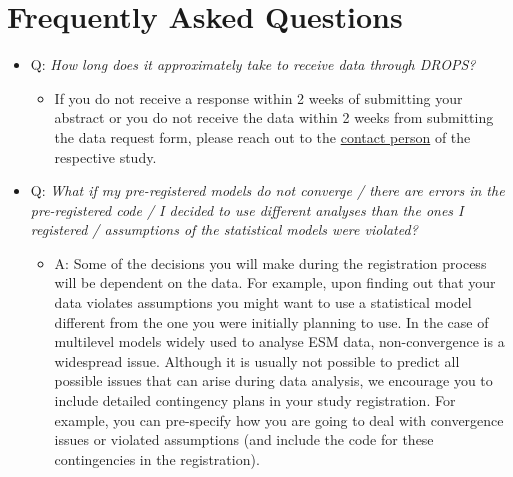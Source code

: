 \documentclass[
]{article}
\providecommand{\tightlist}{%
  \setlength{\itemsep}{0pt}\setlength{\parskip}{0pt}}
\begin{document}
\hypertarget{section-6}{%
\section{}\label{section-6}}

\hypertarget{frequently-asked-questions}{%
\section{Frequently Asked Questions}\label{frequently-asked-questions}}

\begin{itemize}
\tightlist
\item
  Q: \emph{How long does it approximately take to receive data through
  DROPS?}

  \begin{itemize}
  \tightlist
  \item
    If you do not receive a response within 2 weeks of submitting your
    abstract or you do not receive the data within 2 weeks from
    submitting the data request form, please reach out to the
    \protect\hyperlink{_6eanlztnrvpa}{contact person} of the respective
    study.
  \end{itemize}
\item
  Q: \emph{What if my pre-registered models do not converge / there are
  errors in the pre-registered code / I decided to use different
  analyses than the ones I registered / assumptions of the statistical
  models were violated?}

  \begin{itemize}
  \tightlist
  \item
    A: Some of the decisions you will make during the registration
    process will be dependent on the data. For example, upon finding out
    that your data violates assumptions you might want to use a
    statistical model different from the one you were initially planning
    to use. In the case of multilevel models widely used to analyse ESM
    data, non-convergence is a widespread issue. Although it is usually
    not possible to predict all possible issues that can arise during
    data analysis, we encourage you to include detailed contingency
    plans in your study registration. For example, you can pre-specify
    how you are going to deal with convergence issues or violated
    assumptions (and include the code for these contingencies in the
    registration).
  \end{itemize}
\end{itemize}
\end{document}
